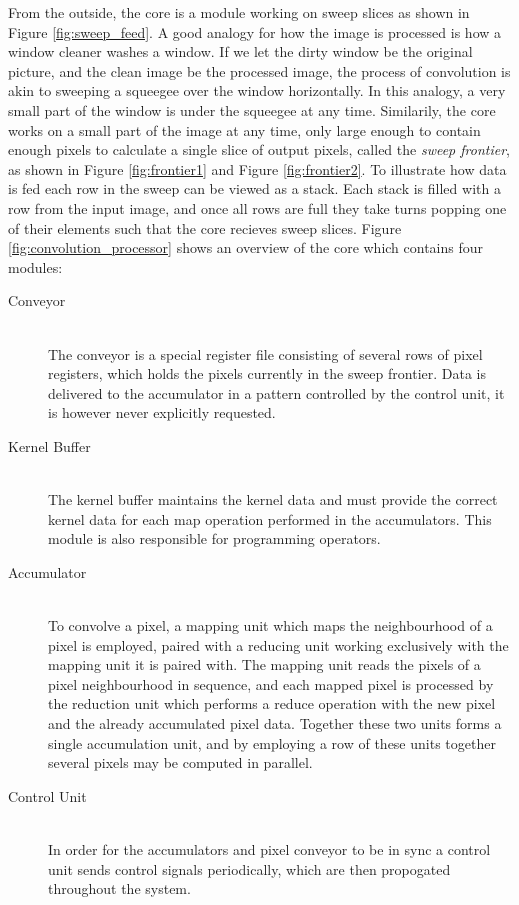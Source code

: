 From the outside, the core is a module working on sweep slices as shown in Figure \ref{fig:sweep_feed}.
A good analogy for how the image is processed is how a window cleaner washes a window.
If we let the dirty window be the original picture, and the clean image be the processed image, the process of convolution is akin to sweeping a squeegee over the window horizontally.
In this analogy, a very small part of the window is under the squeegee at any time.
Similarily, the core works on a small part of the image at any time, only large enough to contain enough pixels to calculate a single slice of output pixels, called the \textit{sweep frontier}, as shown in Figure \ref{fig:frontier1} and Figure \ref{fig:frontier2}.
To illustrate how data is fed each row in the sweep can be viewed as a stack.
Each stack is filled with a row from the input image, and once all rows are full they take turns popping one of their elements such that the core recieves sweep slices.
Figure \ref{fig:convolution_processor} shows an overview of the core which contains four modules:

\begin{description}
    \item[Conveyor] \hfill\\ 
        The conveyor is a special register file consisting of several rows of pixel registers, which holds the pixels currently in the sweep frontier.
        Data is delivered to the accumulator in a pattern controlled by the control unit, it is however never explicitly requested.
    \item[Kernel Buffer] \hfill\\
        The kernel buffer maintains the kernel data and must provide the correct kernel data for each map operation performed in the accumulators.
        This module is also responsible for programming operators.
    \item[Accumulator] \hfill\\
        To convolve a pixel, a mapping unit which maps the neighbourhood of a pixel is employed, paired with a reducing unit working exclusively with the mapping unit it is paired with.
        The mapping unit reads the pixels of a pixel neighbourhood in sequence, and each mapped pixel is processed by the reduction unit which performs a reduce operation with the new pixel and the already accumulated pixel data.
        Together these two units forms a single accumulation unit, and by employing a row of these units together several pixels may be computed in parallel.
    \item[Control Unit] \hfill\\
        In order for the accumulators and pixel conveyor to be in sync a control unit sends control signals periodically, which are then propogated throughout the system.
\end{description}

